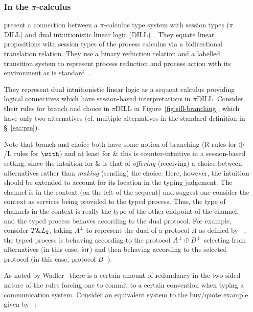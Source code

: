 \subsubsection{In the \texorpdfstring{$\pi$}{pi}-calculus}\label{sec:pis}

\citeauthor{Caires:2010:STI} \cite{Caires:2010:STI} present a connection
between a $\pi$-calculus type system with session types ($\pi$DILL) and dual
intuitionistic linear logic (DILL)~\cite{Barber:1996}. They equate linear
propositions with session types of the process calculus via a bidirectional
translation relation. They use a binary reduction relation and a labelled
transition system to represent process reduction and process action with its
environment as is standard~\cite{Sangiorgi:2001}.


They represent dual intuitionistic linear logic as a sequent calculus
providing logical connectives which have session-based interpretations in
$\pi$DILL. Consider their rules for branch and choice in $\pi$DILL in
Figure~\ref{fig:sill-branching}, which have only two alternatives
(cf. multiple alternatives in the standard definition in \S~\ref{sec:pre}).

Note that branch and choice both have some notion of branching (R rules for
$\oplus$/L rules for $\with$) and at least for \& this is counter-intuitive in
a session-based setting, since the intuition for \& is that of \emph{offering}
(receiving) a choice between alternatives rather than \emph{making} (sending)
the choice. Here, however, the intuition should be extended to account for its
location in the typing judgement. The channel is in the context (on the left
of the sequent) and \citeauthor{Caires:2010:STI} suggest one consider the
context as services being provided to the typed process. Thus, the type of
channels in the context is really the type of the other endpoint of the
channel, and the typed process behaves according to the dual protocol. For
example, consider $T \& L_2$, taking $A^\bot$ to represent the
dual of a protocol $A$ as defined by
\citeauthor{Wadler:2014}~\cite{Wadler:2014}, the typed process is behaving
according to the protocol ${A^\bot}\oplus{B^\bot}$ selecting from
alternatives (in this case, $\mathsf{inr}$) and then behaving according to the
selected protocol (in this case, protocol $B^\bot$).

As noted by Wadler~\cite{Wadler:2014} there is a certain amount of redundancy
in the two-sided nature of the rules forcing one to commit to a certain
convention when typing a communication system. Consider an equivalent system
to the buy/quote example given by
\citeauthor{Caires:2010:STI}~\cite[\S~3]{Caires:2010:STI}:


